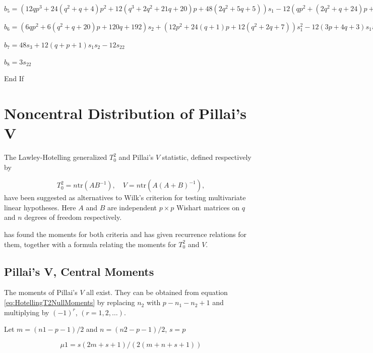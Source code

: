 $  b_5 = (12  q  p^3 + 24  (q^2 + q + 4)  p^2 + 12  (q^3 + 2  q^2 + 21  q + 20)  p + 48  (2  q^2 + 5  q + 5))  s_1 - 12  (q  p^2 + (2  q^2 + q + 24)  p + 32  q + 40)  s_2 - 24  (p^2 + (3  q + 2)  p + 2  q^2 + 3  q + 9)  s_1^2 + 240  s_3 + 48  (p + 2  q + 1)  s_1  s_2 - 36  s_22$

$  b_6 = (6  q  p^2 + 6  (q^2 + q + 20)  p + 120  q + 192)  s_2 + (12  p^2 + 24  (q + 1)  p + 12  (q^2 + 2  q + 7))  s_1^2 - 12  (3  p + 4  q + 3)  s_1  s_2 - 160  s_3 + 24  s_22$

$  b_7 = 48  s_3 + 12  (q + p + 1)  s_1  s_2 - 12  s_22$

$  b_8 = 3  s_22$

End If





\newpage
\section{Noncentral Distribution of Pillai's V}

The Lawley-Hotelling generalized $T_0^2$ and Pillai's $V$ statistic, defined respectively by

\begin{equation}
	T_0^2 = n \text{tr} (AB^{-1}), \quad V = n \text{tr} (A(A+B)^{-1}),
\end{equation}
have been suggested as alternatives to Wilk's criterion for testing multivariate linear hypotheses. Here $A$ and $B$ are independent $p \times p$ Wishart matrices on $q$ and $n$ degrees of freedom respectively.

\cite{Davis_1968, Davis_1970b} has found the moments for both criteria and has given recurrence relations for them, together with a formula relating the moments for $T_0^2$ and  $V$.



\subsection{Pillai's V, Central Moments}
The moments of Pillai's $V$ all exist. They can be obtained from equation  \ref{eq:HotellingT2NullMoments} by replacing $n_2$ with $p-n_1-n_2+1$ and multiplying by $(-1)^r$, $(r=1,2,\ldots)$.

\vpara
Let $m=(n1-p-1)/2$ and $n=(n2-p-1)/2$,   $s=p$

\begin{equation}
	\mu1=s(2m+s+1)/(2(m+n+s+1))
\end{equation}

